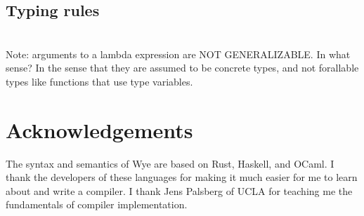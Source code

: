 \documentclass[a4paper, 12pt]{article}
\begin{document}
\subsection{Typing rules}

\begin{align*}
\end{align*}

Note: arguments to a lambda expression are NOT GENERALIZABLE. In what sense? In the sense that they are assumed to be concrete types, and not forallable types like functions that use type variables.


\pagebreak
\section{Acknowledgements}
The syntax and semantics of Wye are based on Rust, Haskell, and OCaml. I thank the developers of these languages for making it much easier for me to learn about and write a compiler. I thank Jens Palsberg of UCLA for teaching me the fundamentals of compiler implementation.

\pagebreak



\end{document}
